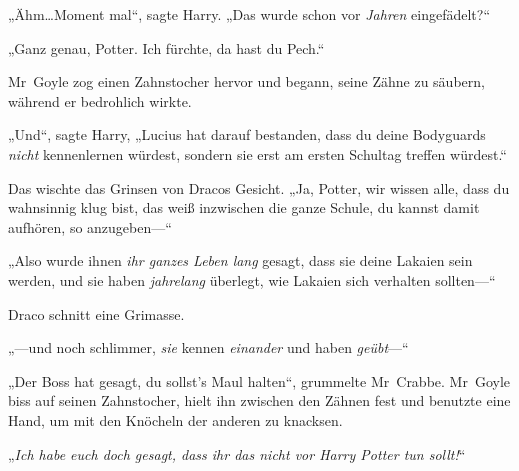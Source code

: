 „Ähm…Moment mal“, sagte Harry. „Das wurde schon vor \emph{Jahren} eingefädelt?“

„Ganz genau, Potter. Ich fürchte, da hast du Pech.“

Mr~Goyle zog einen Zahnstocher hervor und begann, seine Zähne zu säubern, während er bedrohlich wirkte.

„Und“, sagte Harry, „Lucius hat darauf bestanden, dass du deine Bodyguards \emph{nicht} kennenlernen würdest, sondern sie erst am ersten Schultag treffen würdest.“

Das wischte das Grinsen von Dracos Gesicht. „Ja, Potter, wir wissen alle, dass du wahnsinnig klug bist, das weiß inzwischen die ganze Schule, du kannst damit aufhören, so anzugeben—“

„Also wurde ihnen \emph{ihr ganzes Leben lang} gesagt, dass sie deine Lakaien sein werden, und sie haben \emph{jahrelang} überlegt, wie Lakaien sich verhalten sollten—“

Draco schnitt eine Grimasse.

„—und noch schlimmer, \emph{sie} kennen \emph{einander} und haben \emph{geübt}—“

„Der Boss hat gesagt, du sollst’s Maul halten“, grummelte Mr~Crabbe. Mr~Goyle biss auf seinen Zahnstocher, hielt ihn zwischen den Zähnen fest und benutzte eine Hand, um mit den Knöcheln der anderen zu knacksen.

„\emph{Ich habe euch doch gesagt, dass ihr das nicht vor Harry Potter tun sollt!}“


